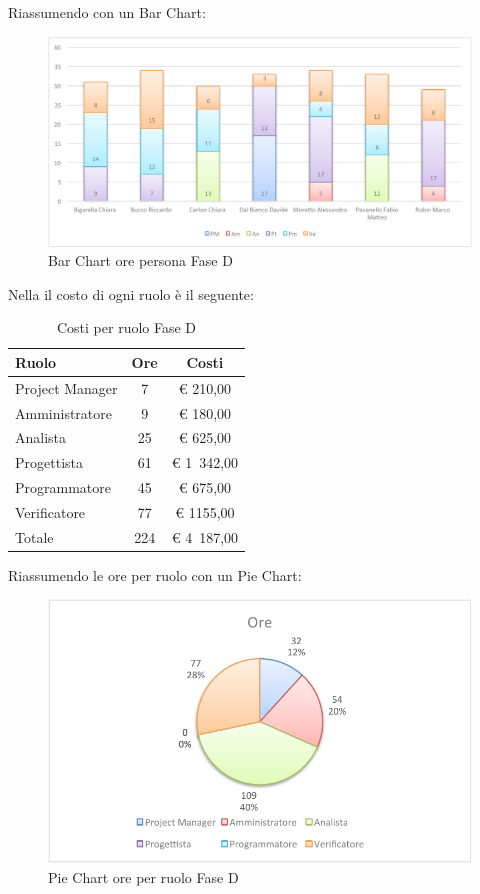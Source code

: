 				Riassumendo con un Bar Chart:
				\begin{figure}[H]\centering
					\includegraphics[width=\textwidth]{PianoDiProgetto/Pics/ChartOreFaseD.pdf}
					\caption{Bar Chart ore persona Fase D}
				\end{figure}
				Nella  il costo di ogni ruolo è il seguente:
				\begin{table}[H]
					\begin{center}
						\begin{tabular}{| l | c | c |}
							\hline
							Ruolo 				& Ore 	& Costi  \\ \hline
							
							Project Manager		& 7 		& \euro{} 210,00 	\\
							Amministratore 		& 9 		& \euro{} 180,00 	\\
							Analista	 		& 25 		& \euro{} 625,00 	\\
							Progettista 		& 61 		& \euro{} 1~342,00  	\\
							Programmatore		& 45 		& \euro{} 675,00 	\\
							Verificatore		& 77 		& \euro{} 1155,00 	\\ \hline \hline
							
							Totale	 			& 224 		& \euro{} 4~187,00 	\\ \hline
						\end{tabular}
					\end{center}
					\caption{Costi per ruolo Fase D}
				\end{table}
				Riassumendo le ore per ruolo con un Pie Chart:
				\begin{figure}[H]\centering
					\includegraphics[width=\textwidth]{PianoDiProgetto/Pics/ChartTotOreFaseD.pdf}
					\caption{Pie Chart ore per ruolo Fase D}
				\end{figure}
